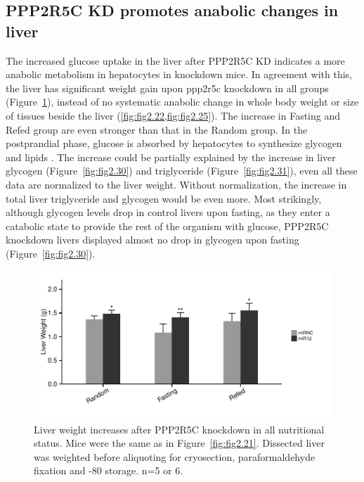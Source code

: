 \subsection{PPP2R5C KD promotes anabolic changes in liver}

The increased glucose uptake in the liver after PPP2R5C KD indicates a more anabolic metabolism in hepatocytes in knockdown mice. In agreement with this, the liver has significant weight gain upon \gls{ppp2r5c} knockdown in all groups (Figure~\ref{fig:fig2.27}), instead of no systematic anabolic change in whole body weight or size of tissues beside the liver  (\cref{fig:fig2.22,fig:fig2.25}). The increase in Fasting and Refed group are even stronger than that in the Random group. In the postprandial phase, glucose is absorbed by hepatocytes to synthesize glycogen and lipids \cite{bechmann_interaction_2012,dashty_quick_2013}. The increase could be partially explained by the increase in liver glycogen (Figure~\ref{fig:fig2.30}) and triglyceride (Figure~\ref{fig:fig2.31}), even all these data are normalized to the liver weight. Without normalization, the increase in total liver triglyceride and glycogen would be even more.  Most strikingly, although glycogen levels drop in control livers upon fasting, as they enter a catabolic state to provide the rest of the organism with glucose, PPP2R5C knockdown livers displayed almost no drop in glycogen upon fasting (Figure~\ref{fig:fig2.30}).    

\begin{figure}[htbp]
\centering
\includegraphics[width=1\textwidth]{figs/fig2-27 liver weight.pdf}
\caption[Liver weight increases after PPP2R5C KD]{\footnotesize Liver weight increases after PPP2R5C knockdown in all nutritional status. Mice were the same as in Figure~\ref{fig:fig2.21}. Dissected liver was weighted before aliquoting for cryosection, paraformaldehyde fixation and -80\celsius{} storage. n=5 or 6.}
\label{fig:fig2.27}
\end{figure}

